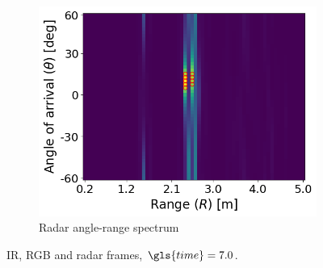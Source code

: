 \begin{figure}
\begin{subfigure}[t]{0.3\textwidth}
    \end{subfigure}
    \hfill
    \begin{subfigure}[t]{0.3\textwidth}
        \includegraphics[width=\textwidth]{fig/5/radar_t_7.0.png}
        \caption{Radar angle-range spectrum}
    \end{subfigure}
    \caption{IR, RGB and radar frames, $\gls{time} = 7.0$.}
    \label{fig:5-frames-1}
\end{figure}

